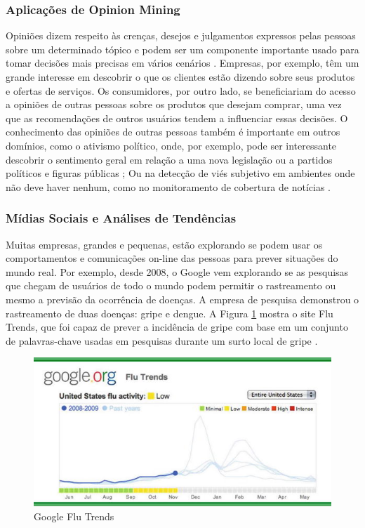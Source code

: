 \documentclass[
	12pt,				%
	openright,			%
	oneside,			%
	a4paper,			%
	english,			%
	spanish,			%
	brazil				%
	]{abntex2}
\begin{document}
	\subsubsection*{Aplicações de Opinion Mining}
	
	Opiniões dizem respeito às crenças, desejos e julgamentos expressos pelas pessoas sobre um determinado tópico e podem ser um componente importante usado para tomar decisões mais precisas em vários cenários \cite{book_discover_practices}. Empresas, por exemplo, têm um grande interesse em descobrir o que os clientes estão dizendo sobre seus produtos e ofertas de serviços. Os consumidores, por outro lado, se beneficiariam do acesso a opiniões de outras pessoas sobre os produtos que desejam comprar, uma vez que as recomendações de outros usuários tendem a influenciar essas decisões. O conhecimento das opiniões de outras pessoas também é importante em outros domínios, como o ativismo político, onde, por exemplo, pode ser interessante descobrir o sentimento geral em relação a uma nova legislação ou a partidos políticos e figuras públicas \cite{book_political_opinion}; Ou na detecção de viés subjetivo em ambientes onde não deve haver nenhum, como no monitoramento de cobertura de notícias \cite{book_Cambria2015}.

	\subsubsection*{Mídias Sociais e Análises de Tendências}
	Muitas empresas, grandes e pequenas, estão explorando se podem usar os comportamentos e comunicações on-line das pessoas para prever situações do mundo real. Por exemplo, desde 2008, o Google vem explorando se as pesquisas que chegam de usuários de todo o mundo podem permitir o rastreamento ou mesmo a previsão da ocorrência de doenças. A empresa de pesquisa demonstrou o rastreamento de duas doenças: gripe e dengue. A Figura \ref{google_flu} mostra o site Flu Trends, que foi capaz de prever a incidência de gripe com base em um conjunto de palavras-chave usadas em pesquisas durante um surto local de gripe \cite{book_social_machines}.

\begin{figure}[H]
\centering
\includegraphics{google_flu}
\caption{Google Flu Trends}
\label{google_flu}
\end{figure}
\end{document}
